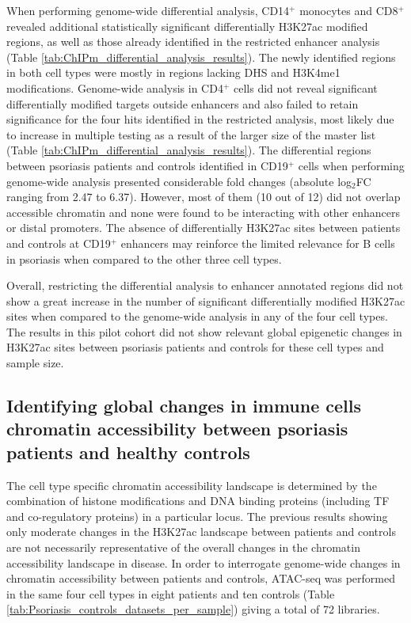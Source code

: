 When performing genome-wide differential analysis, CD14$^+$ monocytes and CD8$^+$ revealed additional statistically significant differentially H3K27ac modified regions, as well as those already identified in the restricted enhancer analysis (Table \ref{tab:ChIPm_differential_analysis_results}). The newly identified regions in both cell types were mostly in regions lacking DHS and  H3K4me1 modifications. Genome-wide analysis in CD4$^+$ cells did not reveal significant differentially modified targets outside enhancers and also failed to retain significance for the four hits identified in the restricted analysis, most likely due to increase in multiple testing as a result of the larger size of the master list (Table \ref{tab:ChIPm_differential_analysis_results}). The differential regions between psoriasis patients and controls identified in CD19$^+$ cells when performing genome-wide analysis presented considerable fold changes (absolute log$_2$FC ranging from 2.47 to 6.37). However, most of them (10 out of 12) did not overlap accessible chromatin and none were found to be interacting with other enhancers or distal promoters. The  absence of differentially H3K27ac sites between patients and controls at CD19$^+$ enhancers may reinforce the limited relevance for B cells in psoriasis when compared to the other three cell types.

Overall, restricting the differential analysis to enhancer annotated regions did not show a great increase in the number of significant differentially modified H3K27ac sites when compared to the genome-wide analysis in any of the four cell types. The results in this pilot cohort did not show relevant global epigenetic changes in H3K27ac sites between psoriasis patients and controls for these cell types and sample size.


\subsection{Identifying global changes in immune cells chromatin accessibility between psoriasis patients and healthy controls}

The cell type specific chromatin accessibility landscape is determined by the combination of histone modifications and DNA binding proteins (including TF and co-regulatory proteins) in a particular locus. The previous results showing only moderate changes in the H3K27ac landscape between patients and controls are not necessarily representative of the overall changes in the chromatin accessibility landscape in disease. In order to interrogate genome-wide changes in chromatin accessibility between patients and controls, ATAC-seq was performed in the same four cell types in eight patients and ten controls (Table \ref{tab:Psoriasis_controls_datasets_per_sample}) giving a total of 72 libraries.



